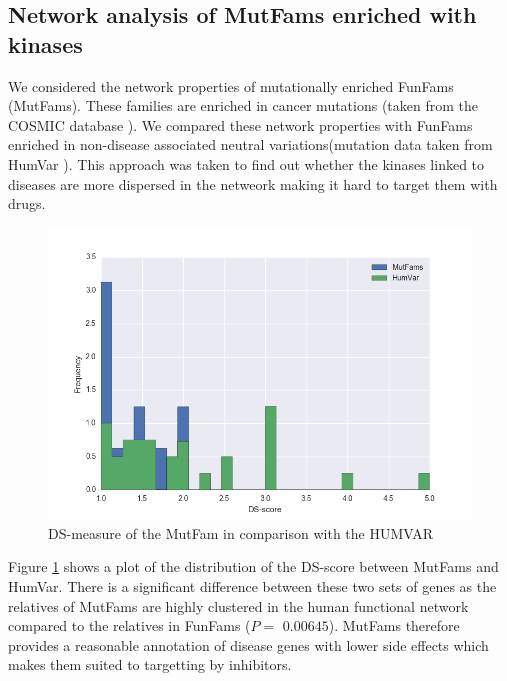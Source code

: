 \documentclass[a4paper, 11pt]{article}
\begin{document}
\subsection*{Network analysis of MutFams enriched with kinases}
We considered the network properties of mutationally enriched FunFams (MutFams). These families are enriched in cancer mutations (taken from the COSMIC database \cite{bamford2004cosmic}). We compared these network properties with FunFams enriched in non-disease associated neutral variations(mutation data taken from HumVar \cite{capriotti2006predicting}). This approach was taken to find out whether the kinases linked to diseases are more dispersed in the netweork making it hard to target them with drugs.
\begin{figure}[H]
	\includegraphics[width=\linewidth]{figures/mutvar.png}
	\centering
	\caption{DS-measure of the MutFam in comparison with the HUMVAR}
	\label{mutvar}
\end{figure}
Figure \ref{mutvar} shows a plot of the distribution of the DS-score between MutFams and HumVar. There is a significant difference between these two sets of genes as the relatives of MutFams are highly clustered in the human functional network compared to the relatives in FunFams ($P=$ $0.00645$). MutFams therefore provides a reasonable annotation of disease genes with lower side effects which makes them suited to targetting by inhibitors.
\end{document}
